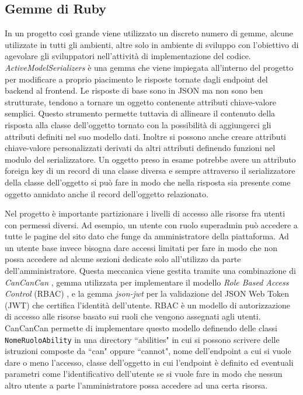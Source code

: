\documentclass[target=bach,aauheader=,style=]{thud}
\begin{document}
\subsection{Gemme di Ruby}

In un progetto così grande viene utilizzato un discreto numero di gemme, alcune utilizzate in tutti gli ambienti, altre solo in ambiente di sviluppo con l'obiettivo di agevolare gli sviluppatori
nell'attività di implementazione del codice. \textit{ActiveModelSerializers}\cite{active_model_serializers_gem} è una gemma che viene impiegata all'interno del progetto per modificare a proprio
piacimento le risposte tornate dagli endpoint del backend al frontend. Le risposte di base sono in JSON ma non sono ben strutturate, tendono a tornare un oggetto
contenente attributi chiave-valore semplici. Questo strumento permette tuttavia di allineare il contenuto della risposta alla classe dell'oggetto tornato con la possibilità di aggiungerci
gli attributi definiti nel suo modello dati. Inoltre si possono anche creare attributi chiave-valore personalizzati derivati da altri
attributi definendo funzioni nel modulo del serializzatore. Un oggetto preso in esame potrebbe avere un attributo foreign key di un record di una classe diversa e sempre attraverso il serializzatore
della classe dell'oggetto si può fare in modo che nella risposta sia presente come oggetto annidato anche il record dell'oggetto relazionato.

Nel progetto è importante partizionare i livelli di accesso alle risorse fra utenti con permessi diversi. Ad esempio, un utente con ruolo superadmin può accedere
a tutte le pagine del sito dato che funge da amministratore della piattaforma. Ad un utente base invece bisogna dare accessi limitati per fare in modo che non possa accedere ad alcune sezioni dedicate
solo all'utilizzo da parte dell'amministratore. Questa meccanica viene gestita tramite una combinazione di \textit{CanCanCan} \cite{cancancan_gem}, gemma utilizzata per implementare
il modello \textit{Role Based Access Control} (RBAC) \cite{ibm_rbac}, e la gemma \textit{json-jwt} \cite{json_jwt_gem} per la validazione del JSON Web Token (JWT) che
certifica l'identità dell'utente. RBAC è un modello di autorizzazione di accesso alle risorse basato sui ruoli che vengono assegnati agli utenti.
CanCanCan permette di implementare questo modello definendo delle classi \texttt{NomeRuoloAbility} in una directory ``abilities" in cui si possono scrivere delle
istruzioni composte da ``can" oppure ``cannot", nome dell'endpoint a cui si vuole dare o meno l'accesso, classe dell'oggetto in cui l'endpoint è definito ed eventuali
parametri come l'identificativo dell'utente se si vuole fare in modo che nessun altro utente a parte l'amministratore possa accedere ad una certa risorsa.
\end{document}
